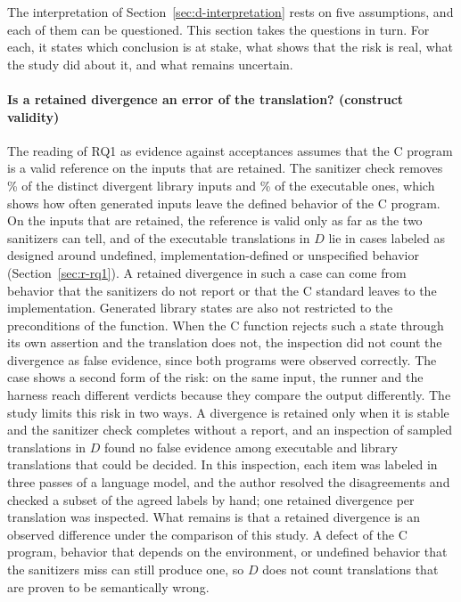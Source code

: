 The interpretation of Section~\ref{sec:d-interpretation} rests on five assumptions, and each of them can be questioned. This section takes the questions in turn. For each, it states which conclusion is at stake, what shows that the risk is real, what the study did about it, and what remains uncertain.

\paragraph{Is a retained divergence an error of the translation? (construct validity)} The reading of RQ1 as evidence against acceptances assumes that the C program is a valid reference on the inputs that are retained. The sanitizer check removes \rqUbInputsLibAllPct\% of the distinct divergent library inputs and \rqUbInputsExeAllPct\% of the executable ones, which shows how often generated inputs leave the defined behavior of the C program. On the inputs that are retained, the reference is valid only as far as the two sanitizers can tell, and \rqBThreeDYesExeAllNum{} of the \rqFPExeAllNum{} executable translations in $D$ lie in cases labeled as designed around undefined, implementation-defined or unspecified behavior (Section~\ref{sec:r-rq1}). A retained divergence in such a case can come from behavior that the sanitizers do not report or that the C standard leaves to the implementation. Generated library states are also not restricted to the preconditions of the function. When the C function rejects such a state through its own assertion and the translation does not, the inspection did not count the divergence as false evidence, since both programs were observed correctly. The case  shows a second form of the risk: on the same input, the runner and the harness reach different verdicts because they compare the output differently. The study limits this risk in two ways. A divergence is retained only when it is stable and the sanitizer check completes without a report, and an inspection of sampled translations in $D$ found no false evidence among \rqRNineFalseExeDen{} executable and \rqRNineFalseLibDen{} library translations that could be decided. In this inspection, each item was labeled in three passes of a language model, and the author resolved the disagreements and checked a subset of the agreed labels by hand; one retained divergence per translation was inspected. What remains is that a retained divergence is an observed difference under the comparison of this study. A defect of the C program, behavior that depends on the environment, or undefined behavior that the sanitizers miss can still produce one, so $D$ does not count translations that are proven to be semantically wrong.

